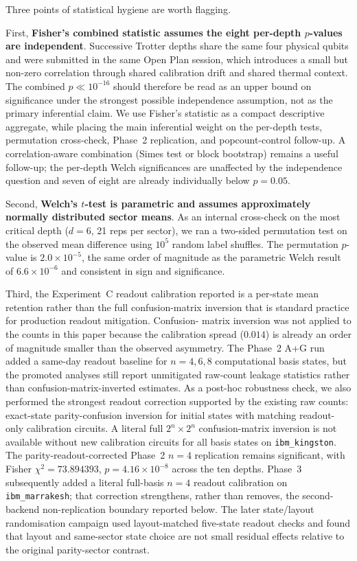 \documentclass[reprint,aps,physrev,superscriptaddress,floatfix,longbibliography]{revtex4-2}
\begin{document}
Three points of statistical hygiene are worth flagging.

First, \textbf{Fisher's combined statistic assumes the eight per-depth
$p$-values are independent}. Successive Trotter depths share the same
four physical qubits and were submitted in the same Open Plan
session, which introduces a small but non-zero correlation through
shared calibration drift and shared thermal context. The combined
$p \ll 10^{-16}$ should therefore be read as an upper bound on
significance under the strongest possible independence assumption, not
as the primary inferential claim.
We use Fisher's statistic as a compact descriptive aggregate, while
placing the main inferential weight on the per-depth tests,
permutation cross-check, Phase~2 replication, and popcount-control
follow-up. A correlation-aware combination (Simes test or block
bootstrap) remains a useful follow-up; the per-depth Welch
significances are unaffected by the independence question and seven
of eight are already individually below $p = 0.05$.

Second, \textbf{Welch's $t$-test is parametric and assumes
approximately normally distributed sector means}. As an internal
cross-check on the most critical depth ($d = 6$, 21 reps per sector),
we ran a two-sided permutation test on the observed mean difference
using $10^{5}$ random label shuffles. The permutation $p$-value is
$2.0 \times 10^{-5}$, the same order of magnitude as the parametric
Welch result of $6.6 \times 10^{-6}$ and consistent in sign and
significance.

Third, the Experiment~C readout calibration reported is a per-state
mean retention rather than the full confusion-matrix inversion that
is standard practice for production readout mitigation. Confusion-
matrix inversion was not applied to the counts in this paper because
the calibration spread ($0.014$) is already an order of magnitude
smaller than the observed asymmetry. The Phase~2 A+G run added a
same-day readout baseline for $n=4,6,8$ computational basis states,
but the promoted analyses still report unmitigated raw-count leakage
statistics rather than confusion-matrix-inverted estimates. As a
post-hoc robustness check, we also performed the strongest readout
correction supported by the existing raw counts: exact-state
parity-confusion inversion for initial states with matching
readout-only calibration circuits. A literal full $2^n\times2^n$
confusion-matrix inversion is not available without new calibration
circuits for all basis states on \texttt{ibm\_kingston}. The
parity-readout-corrected Phase~2 $n=4$ replication remains significant, with Fisher
$\chi^2=73.894393$, $p=4.16\times10^{-8}$ across the ten depths.
Phase~3 subsequently added a literal full-basis $n=4$ readout
calibration on \texttt{ibm\_marrakesh}; that correction strengthens,
rather than removes, the second-backend non-replication boundary
reported below. The later state/layout randomisation campaign used
layout-matched five-state readout checks and found that layout and
same-sector state choice are not small residual effects relative to
the original parity-sector contrast.
\end{document}
